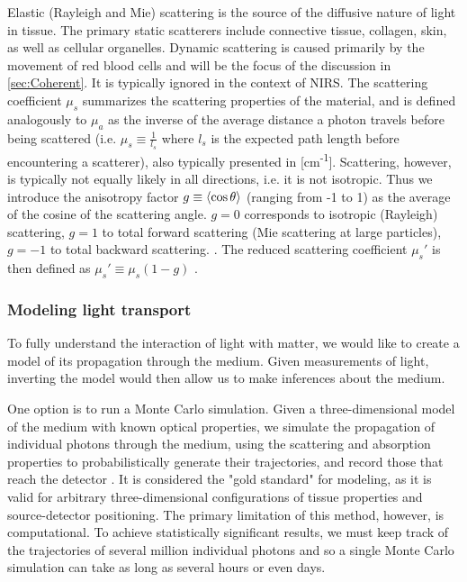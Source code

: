 Elastic (Rayleigh and Mie) scattering is the source of the diffusive nature of light in tissue. The primary static scatterers include connective tissue, collagen, skin, as well as cellular organelles. Dynamic scattering is caused primarily by the movement of red blood cells and will be the focus of the discussion in \autoref{sec:Coherent}. It is typically ignored in the context of NIRS. The scattering coefficient $\mu_s$ summarizes the scattering properties of the material, and is defined analogously to $\mu_a$ as the inverse of the average distance a photon travels before being scattered (i.e. $\mu_s \equiv \frac{1}{l_s}$ where $l_s$ is the expected path length before encountering a scatterer), also typically presented in [cm\textsuperscript{-1}]. Scattering, however, is typically not equally likely in all directions, i.e. it is not isotropic. Thus we introduce the anisotropy factor $g \equiv \expval{\cos\theta}$ (ranging from -1 to 1) as the average of the cosine of the scattering angle. $g=0$ corresponds to isotropic (Rayleigh) scattering, $g=1$ to total forward scattering (Mie scattering at large particles), $g=-1$ to total backward scattering. \cite[ch. 5.2]{Handbook}. The reduced scattering coefficient $\mu_s'$ is then defined as $\mu_s' \equiv \mu_s(1-g)$ \cite{Madsen2013}.

\subsubsection{Modeling light transport}
To fully understand the interaction of light with matter, we would like to create a model of its propagation through the medium. Given measurements of light, inverting the model would then allow us to make inferences about the medium. 

One option is to run a Monte Carlo simulation. Given a three-dimensional model of the medium with known optical properties, we simulate the propagation of individual photons through the medium, using the scattering and absorption properties to probabilistically generate their trajectories, and record those that reach the detector \cite{Boas2002}. It is considered the "gold standard" for modeling, as it is valid for arbitrary three-dimensional configurations of tissue properties and source-detector positioning. The primary limitation of this method, however, is computational. To achieve statistically significant results, we must keep track of the trajectories of several million individual photons and so a single Monte Carlo simulation can take as long as several hours or even days. 

